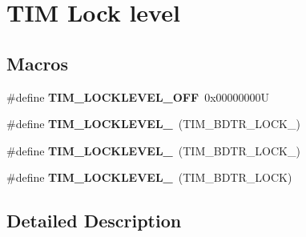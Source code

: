 \hypertarget{group___t_i_m___lock__level}{}\section{T\+IM Lock level}
\label{group___t_i_m___lock__level}
\subsection*{Macros}
\begin{DoxyCompactItemize}
\item 
\mbox{\label{group___t_i_m___lock__level_ga304aece56a9391a4d9b1016144d98fbd}} 
\#define {\bfseries T\+I\+M\+\_\+\+L\+O\+C\+K\+L\+E\+V\+E\+L\+\_\+\+O\+FF}~0x00000000U
\item 
\mbox{\label{group___t_i_m___lock__level_ga46dc7705788ba2ce5135c43b998ef4dd}} 
\#define {\bfseries T\+I\+M\+\_\+\+L\+O\+C\+K\+L\+E\+V\+E\+L\+\_}~(T\+I\+M\+\_\+\+B\+D\+T\+R\+\_\+\+L\+O\+C\+K\+\_)
\item 
\mbox{\label{group___t_i_m___lock__level_ga03a5ed2aded43ccfe7ab12a9dd53d251}} 
\#define {\bfseries T\+I\+M\+\_\+\+L\+O\+C\+K\+L\+E\+V\+E\+L\+\_}~(T\+I\+M\+\_\+\+B\+D\+T\+R\+\_\+\+L\+O\+C\+K\+\_)
\item 
\mbox{\label{group___t_i_m___lock__level_gaa1afed375c27151608e388fdf4a57a13}} 
\#define {\bfseries T\+I\+M\+\_\+\+L\+O\+C\+K\+L\+E\+V\+E\+L\+\_}~(T\+I\+M\+\_\+\+B\+D\+T\+R\+\_\+\+L\+O\+CK)
\end{DoxyCompactItemize}


\subsection{Detailed Description}
